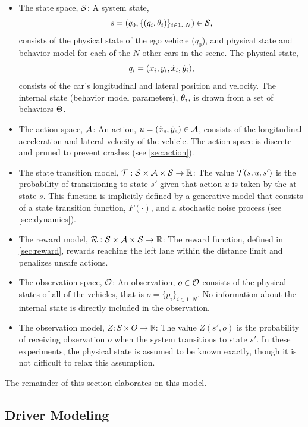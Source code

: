 \begin{itemize}
    \item The state space, $\mathcal{S}$: A system state, $$s = (q_0, \{({q}_i,{\theta}_i)\}_{i \in 1..N}) \in \mathcal{S}\text{,}$$ consists of the physical state of the ego vehicle ($q_0$), and physical state and behavior model for each of the $N$ other cars in the scene.
The physical state, $${q}_i = ({x}_i,{y}_i,{\dot{x}}_i,{\dot{y}}_i)\text{,}$$ consists of the car's longitudinal and lateral position and velocity. The internal state (behavior model parameters), ${\theta}_i$, is drawn from a set of behaviors $\Theta$.
    \item The action space, $\mathcal{A}$: An action, $u = ({\ddot{x}}_e, {\ddot{y}}_e) \in \mathcal{A}$, consists of the longitudinal acceleration and lateral velocity of the \av{} vehicle. The action space is discrete and pruned to prevent crashes (see \cref{sec:action}).
    \item The state transition model, $\mathcal{T}: \mathcal{S} \times \mathcal{A} \times \mathcal{S} \to \mathbb{R}$: The value $\mathcal{T}(s,u,s')$ is the probability of transitioning to state $s'$ given that action $u$ is taken by the \av{} at state $s$. This function is implicitly defined by a generative model that consists of a state transition function, $F(\cdot)$, and a stochastic noise process (see \cref{sec:dynamics}).
    \item The reward model, $\mathcal{R}:\mathcal{S} \times \mathcal{A} \times \mathcal{S} \to \mathbb{R}$: The reward function, defined in \cref{sec:reward}, rewards reaching the left lane within the distance limit and penalizes unsafe actions.
    \item The observation space, $\mathcal{O}$: An observation, $o \in \mathcal{O}$ consists of the physical states of all of the vehicles, that is $o=\{p_i\}_{i \in 1..N}$. No information about the internal state is directly included in the observation.
    \item The observation model, $Z: S \times O \to \mathbb{R}$: The value $Z(s',o)$ is the probability of receiving observation $o$ when the system transitions to state $s'$. In these experiments, the physical state is assumed to be known exactly, though it is not difficult to relax this assumption. %
\end{itemize}
The remainder of this section elaborates on this model.

\subsection{Driver Modeling} \label{sec:driver}

